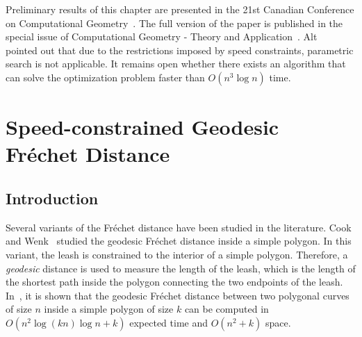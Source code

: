\documentclass[12pt]{dalthesis}
\newcommand{\eps}{\varepsilon}
\newcommand{\REM}[1]{}
\newcommand{\Frechet}{Fr\'echet }
\begin{document}
Preliminary results of this chapter 
are presented in the 21st Canadian Conference on 
Computational Geometry~\cite{oursCCCG2009}. 
The full version of the paper is published in 
the special issue of Computational Geometry - Theory and Application~\cite{oursSpeedJournal}.
Alt~\cite{AltFinal} pointed out 
that due to the restrictions imposed by speed constraints, 
parametric search is not applicable.
It remains open whether there exists an algorithm 
that can solve the optimization 
problem faster than $O(n^3 \log n)$ time.
\clearpage{}


\clearpage{}\chapter{Speed-constrained Geodesic \Frechet Distance }
\label{ch:speed-geodesic}

\REM{
Given two polygonal curves inside a simple polygon,
we study the problem of finding the \Frechet distance between the two curves
under the following two conditions
(i) the distance between two points on the curves is measured as the length of the shortest path
between them lying inside the simple polygon, and 
(ii) the traversal along each segment of the polygonal curves 
is restricted to be between a minimum and a maximum permissible speed
assigned to that segment.

We provide an algorithm that decides in $O(n^2 (k + n))$ time 
whether the speed-constrained geodesic \Frechet distance between two polygonal curves inside a 
simple polygon is within a given value $\eps$, 
where $n$ is the number of segments in the curves, and $k$ is the complexity of the polygon. 
This leads to an algorithm for solving this variant of the \Frechet distance exactly
in $O(n^2(k + n)\log n)$ time and $O(n^2+k)$ space.
}





\section{Introduction} \label{sec:intro}




Several variants of the \Frechet distance have been studied in the literature.
Cook and Wenk~\cite{WenkC08a} studied  
the geodesic \Frechet distance inside a simple polygon.
In this variant, the leash is constrained to the interior of a simple polygon.  
Therefore,
a \emph{geodesic} distance is used to measure the length of the leash, which is 
the length of the shortest path inside the polygon connecting the two endpoints of the leash.
In~\cite{WenkC08a}, it is shown that the geodesic \Frechet distance 
between two polygonal curves of size $n$ inside a simple polygon of size $k$
can be computed in $O(n^2 \log (kn) \log n +k)$ expected time and $O(n^2+ k)$ space. 
\end{document}
